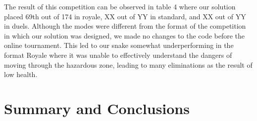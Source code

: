 \documentclass[a4paper,12pt]{article}
\begin{document}
The result of this competition can be observed in table 4 where our solution placed 69th out of 174 in royale, XX out of YY in standard, and XX out of YY in duels. Although the modes were different from the format of the competition in which our solution was designed, we made no changes to the code before the online tournament. This led to our snake somewhat underperforming in the format Royale where it was unable to effectively understand the dangers of moving through the hazardous zone, leading to many eliminations as the result of low health. 




\newpage
\section{Summary and Conclusions}
\label{sec:summary}



\clearpage


\end{document}
